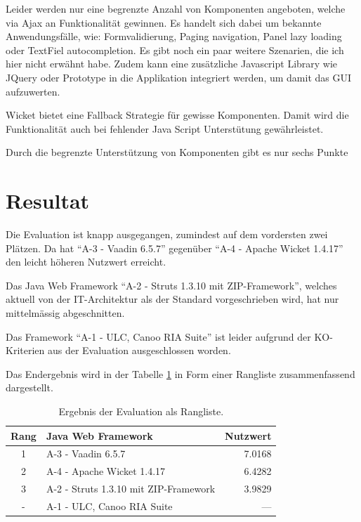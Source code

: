   Leider werden nur eine begrenzte Anzahl von Komponenten angeboten, welche
  via \ac{Ajax} an Funktionalität gewinnen. Es handelt sich dabei um bekannte
  Anwendungsfälle, wie: Formvalidierung, Paging navigation, Panel lazy loading
  oder TextFiel autocompletion. Es gibt noch ein paar weitere Szenarien,
  die ich hier nicht erwähnt habe. Zudem kann eine zusätzliche Javascript
  Library wie JQuery oder Prototype in die Applikation integriert werden, um
  damit das \ac{GUI} aufzuwerten.
  
  Wicket bietet eine Fallback Strategie für gewisse Komponenten. Damit wird die
  Funktionalität auch bei fehlender Java Script Unterstütung gewährleistet.
  
  Durch die begrenzte Unterstützung von Komponenten gibt es nur sechs Punkte

  \section{Resultat}
  
  Die Evaluation ist knapp ausgegangen, zumindest auf dem vordersten zwei
  Plätzen. Da hat ``A-3 - Vaadin 6.5.7'' gegenüber ``A-4 - Apache Wicket
  1.4.17'' den leicht höheren Nutzwert erreicht.
  
  Das Java Web Framework ``A-2 - Struts 1.3.10 mit ZIP-Framework'', welches
  aktuell von der IT-Architektur als der Standard vorgeschrieben wird, hat nur
  mittelmässig abgeschnitten.

  Das Framework ``A-1 - ULC, Canoo RIA Suite'' ist leider aufgrund der
  KO-Kriterien aus der Evaluation ausgeschlossen worden.
  
  Das Endergebnis wird in der Tabelle \ref{tab:ergebnisDerEvaluation} in Form
  einer Rangliste zusammenfassend dargestellt.
  \newline
  
  \begin{table}[ht]
    \sffamily 
    \begin{center}
      \begin{tabular}{clr}
        \toprule
        \textbf{Rang} & \textbf{Java Web Framework} & \textbf{Nutzwert} \\
        \midrule
        1 & A-3 - Vaadin 6.5.7 & 7.0168 \\
        2 & A-4 - Apache Wicket 1.4.17 & 6.4282 \\
        3 & A-2 - Struts 1.3.10 mit ZIP-Framework & 3.9829 \\
        - & A-1 - ULC, Canoo RIA Suite & --- \\
        \bottomrule
      \end{tabular}
      \caption{Ergebnis der Evaluation als Rangliste.}
      \label{tab:ergebnisDerEvaluation}
    \end{center}
  \end{table}
